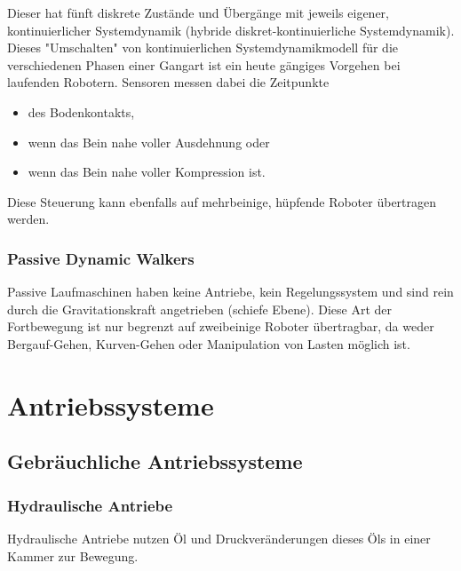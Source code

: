 \documentclass[a4paper, 11pt, accentcolor = tud3b]{tudreport}
\begin{document}
					Dieser hat fünft diskrete Zustände und Übergänge mit jeweils eigener, kontinuierlicher Systemdynamik (hybride diskret-kontinuierliche Systemdynamik). Dieses "Umschalten" von kontinuierlichen Systemdynamikmodell für die verschiedenen Phasen einer Gangart ist ein heute gängiges Vorgehen bei laufenden Robotern. Sensoren messen dabei die Zeitpunkte
					\begin{itemize}
						\item des Bodenkontakts,
						\item wenn das Bein nahe voller Ausdehnung oder
						\item wenn das Bein nahe voller Kompression ist.
					\end{itemize}
					Diese Steuerung kann ebenfalls auf mehrbeinige, hüpfende Roboter übertragen werden.

			\subsection{Passive Dynamic Walkers}
				Passive Laufmaschinen haben keine Antriebe, kein Regelungssystem und sind rein durch die Gravitationskraft angetrieben (schiefe Ebene). Diese Art der Fortbewegung ist nur begrenzt auf zweibeinige Roboter übertragbar, da weder Bergauf-Gehen, Kurven-Gehen oder Manipulation von Lasten möglich ist.

	\chapter{Antriebssysteme}
		\section{Gebräuchliche Antriebssysteme}
			\subsection{Hydraulische Antriebe}
				Hydraulische Antriebe nutzen Öl und Druckveränderungen dieses Öls in einer Kammer zur Bewegung.
				
\end{document}
